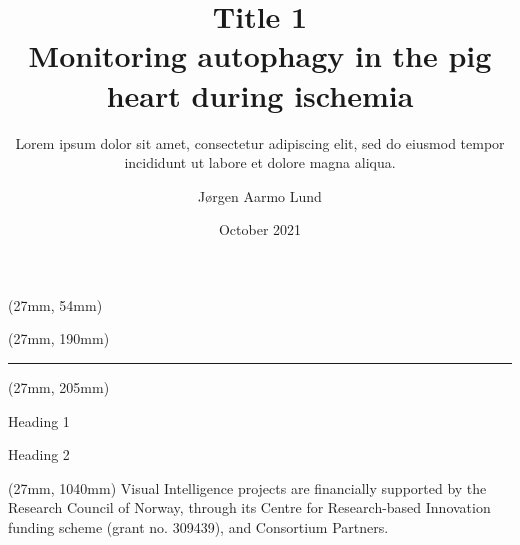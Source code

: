 \documentclass{beamer}
\title{Title 1 \\ Monitoring autophagy in the pig heart during ischemia}
\subtitle{Lorem ipsum dolor sit amet, consectetur adipiscing elit, sed do eiusmod tempor incididunt ut labore et dolore magna aliqua.}
\author{Jørgen Aarmo Lund}
\institute{Machine Learning Group, UiT The Arctic University of Norway}
\date{October 2021}
\begin{document}
\begin{frame}
    \begin{textblock*}{787mm}(27mm, 54mm)
        \maketitle
    \end{textblock*}
    \begin{textblock*}{787mm}(27mm, 190mm)
        \rule{\textwidth}{1pt}
    \end{textblock*}
    
    \begin{textblock*}{257mm}(27mm, 205mm)
        \begin{minipage}[t][800mm][t]{\textwidth}
            
            \begin{block}{Heading 1}
                \lipsum[1-2]
            \end{block}
            \begin{block}{Heading 2}
                \lipsum[3-4]
            \end{block}
                    
        \end{minipage}
    \end{textblock*}


    \begin{textblock*}{257mm}(27mm, 1040mm)
        {Visual Intelligence projects are financially supported by the Research Council of Norway, through its Centre for Research-based Innovation funding scheme (grant no. 309439), and Consortium Partners.}
    \end{textblock*}
    

\end{frame}
\end{document}
